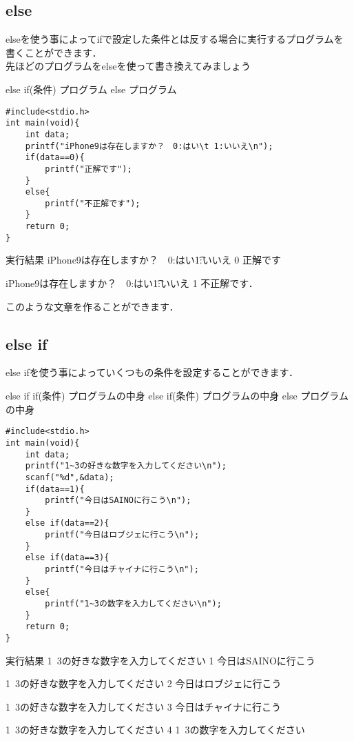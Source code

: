 \documentclass[a4j,titlepage,dvipdfmx]{jsarticle}   %
\begin{document}
\subsection{else}
elseを使う事によってifで設定した条件とは反する場合に実行するプログラムを書くことができます．\\
先ほどのプログラムをelseを使って書き換えてみましょう
\begin{itembox}{else}
if(条件) {
	プログラム
}
else{
	プログラム
}
\end{itembox}
\begin{lstlisting}
#include<stdio.h>
int main(void){
	int data;
    printf("iPhone9は存在しますか？　0:はい\t 1:いいえ\n");
    if(data==0){
    	printf("正解です");
    }
    else{
    	printf("不正解です");
    }
    return 0;
}
\end{lstlisting}
\begin{itembox}{実行結果}
iPhone9は存在しますか？　0:はい\t 1:いいえ
0
正解です

iPhone9は存在しますか？　0:はい\t 1:いいえ
1
不正解です．
\end{itembox}
このような文章を作ることができます．\\
\subsection{else if}
else ifを使う事によっていくつもの条件を設定することができます．\\
\begin{itembox}{else if}
if(条件){
	プログラムの中身
}
else if(条件){
	プログラムの中身
}
else{
	プログラムの中身
}
\end{itembox}
\begin{lstlisting}
#include<stdio.h>
int main(void){
    int data;
    printf("1~3の好きな数字を入力してください\n");
    scanf("%d",&data);
    if(data==1){
    	printf("今日はSAINOに行こう\n");
    }
    else if(data==2){
    	printf("今日はロブジェに行こう\n");
    }
    else if(data==3){
    	printf("今日はチャイナに行こう\n");
    }
    else{
    	printf("1~3の数字を入力してください\n");
    }
    return 0;
}
\end{lstlisting}

\begin{itembox}{実行結果}
1~3の好きな数字を入力してください
1
今日はSAINOに行こう

1~3の好きな数字を入力してください
2
今日はロブジェに行こう

1~3の好きな数字を入力してください
3
今日はチャイナに行こう

1~3の好きな数字を入力してください
4
1~3の数字を入力してください
\end{itembox}
\end{document}
